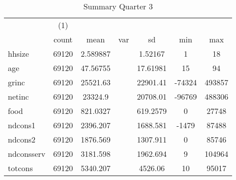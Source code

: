 \begin{table}[htbp]\centering
\def\sym#1{\ifmmode^{#1}\else\(^{#1}\)\fi}
\caption{Summary Quarter 3 \label{sum\_Q3}}
\begin{tabular}{l*{1}{cccccc}}
\hline\hline
            &\multicolumn{1}{c}{(1)}&            &            &            &            &            \\
            &       count&        mean&         var&          sd&         min&         max\\
\hline
hhsize      &       69120&    2.589887&            &     1.52167&           1&          18\\
age         &       69120&    47.56755&            &    17.61981&          15&          94\\
grinc       &       69120&    25521.63&            &    22901.41&      -74324&      493857\\
netinc      &       69120&     23324.9&            &    20708.01&      -96769&      488306\\
food        &       69120&    821.0327&            &    619.2579&           0&       27748\\
ndcons1     &       69120&    2396.207&            &    1688.581&       -1479&       87488\\
ndcons2     &       69120&    1876.569&            &    1307.911&           0&       85746\\
ndconsserv  &       69120&    3181.598&            &    1962.694&           9&      104964\\
totcons     &       69120&    5340.207&            &     4526.06&          10&       95017\\
\hline\hline
\end{tabular}
\end{table}

